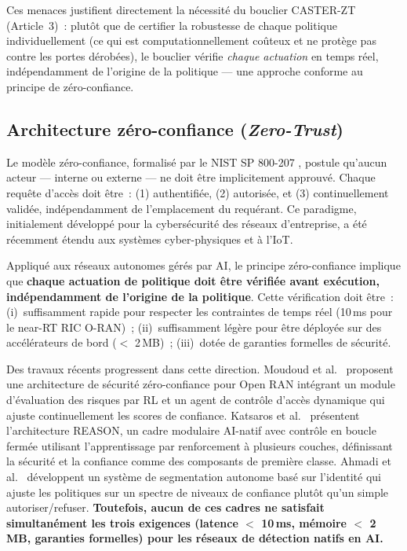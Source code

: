 Ces menaces justifient directement la nécessité du bouclier CASTER-ZT (Article~3)~: plutôt que de certifier la robustesse de chaque politique individuellement (ce qui est computationnellement coûteux et ne protège pas contre les portes dérobées), le bouclier vérifie \emph{chaque actuation} en temps réel, indépendamment de l'origine de la politique --- une approche conforme au principe de zéro-confiance.

\subsection{Architecture zéro-confiance (\emph{Zero-Trust})}

Le modèle zéro-confiance, formalisé par le NIST SP 800-207 \cite{rose2020nist}, postule qu'aucun acteur --- interne ou externe --- ne doit être implicitement approuvé. Chaque requête d'accès doit être~: (1) authentifiée, (2) autorisée, et (3) continuellement validée, indépendamment de l'emplacement du requérant. Ce paradigme, initialement développé pour la cybersécurité des réseaux d'entreprise, a été récemment étendu aux systèmes cyber-physiques et à l'IoT.

Appliqué aux réseaux autonomes gérés par AI, le principe zéro-confiance implique que \textbf{chaque actuation de politique doit être vérifiée avant exécution, indépendamment de l'origine de la politique}. Cette vérification doit être~: (i)~suffisamment rapide pour respecter les contraintes de temps réel (10\,ms pour le near-RT RIC O-RAN)~; (ii)~suffisamment légère pour être déployée sur des accélérateurs de bord ($<$ 2\,MB)~; (iii)~dotée de garanties formelles de sécurité.

Des travaux récents progressent dans cette direction. Moudoud et al.\ \cite{moudoud2025oran_zt} proposent une architecture de sécurité zéro-confiance pour Open RAN intégrant un module d'évaluation des risques par RL et un agent de contrôle d'accès dynamique qui ajuste continuellement les scores de confiance. Katsaros et al.\ \cite{katsaros2024reason} présentent l'architecture REASON, un cadre modulaire AI-natif avec contrôle en boucle fermée utilisant l'apprentissage par renforcement à plusieurs couches, définissant la sécurité et la confiance comme des composants de première classe. Ahmadi et al.\ \cite{ahmadi2025zt_segmentation} développent un système de segmentation autonome basé sur l'identité qui ajuste les politiques sur un spectre de niveaux de confiance plutôt qu'un simple autoriser/refuser. \textbf{Toutefois, aucun de ces cadres ne satisfait simultanément les trois exigences (latence $<$ 10\,ms, mémoire $<$ 2\,MB, garanties formelles) pour les réseaux de détection natifs en AI.}

